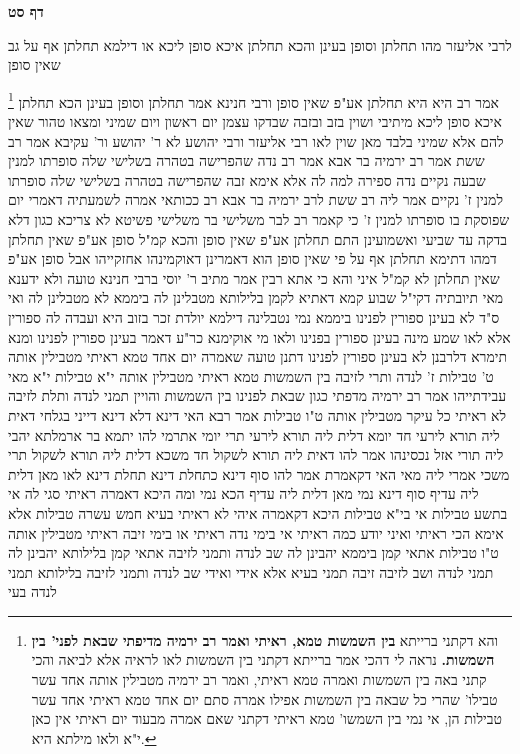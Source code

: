 \documentclass[12pt, openany]{book}
\newcommand{\sethebfont}{
\fontsize{10.5pt}{21.0pt} \selectfont
}
\newcommand{\twocol}[1]{
	{\sethebfont \begin{multicols}{2}
			#1
	\end{multicols}}	
}
\newcommand{\sectname}{}
\newcommand{\newsection}[1]{
	\addcontentsline{toc}{section}{#1}
	\renewcommand{\sectname}{#1}	
	\vspace{-\baselineskip}
	\begin{center}
		\textbf{%
\fontsize{16pt}{16pt}\selectfont
			#1}
	\end{center}
	\vspace{-\baselineskip}
	\nopagebreak
}
\newcommand{\footnotecomment}[1]{
	\renewcommand\thefootnote{}
	\footnote{#1}}
\newcommand{\commenta}[1]{\footnotecomment{#1}}
\begin{document}
\newsection{דף סט}
\twocol{לרבי אליעזר מהו תחלתן וסופן בעינן והכא תחלתן איכא סופן ליכא או דילמא תחלתן אף על גב שאין סופן 
\commenta{והא דקתני ברייתא \textbf{בין השמשות טמא, ראיתי ואמר רב ירמיה מדיפתי שבאת לפני' בין השמשות.} נראה לי דהכי אמר ברייתא דקתני בין השמשות לאו לראיה אלא לביאה והכי קתני באה בין השמשות ואמרה טמא ראיתי, ואמר רב ירמיה מטבילין אותה אחד עשר טבילו' שהרי כל שבאה בין השמשות אפילו אמרה סתם יום אחד טמא ראיתי אחד עשר טבילות הן, אי נמי בין השמשו' טמא ראיתי דקתני שאם אמרה מבעוד יום ראיתי אין כאן י"א ולאו מילתא היא. }
אמר רב היא היא תחלתן אע"פ שאין סופן ורבי חנינא אמר תחלתן וסופן בעינן הכא תחלתן איכא סופן ליכא 
מיתיבי ושוין בזב ובזבה שבדקו עצמן יום ראשון ויום שמיני ומצאו טהור שאין להם אלא שמיני בלבד מאן שוין לאו רבי אליעזר ורבי יהושע 
לא ר' יהושע ור' עקיבא 
אמר רב ששת אמר רב ירמיה בר אבא אמר רב נדה שהפרישה בטהרה בשלישי שלה סופרתו למנין שבעה נקיים 
נדה ספירה למה לה אלא אימא זבה שהפרישה בטהרה בשלישי שלה סופרתו למנין ז' נקיים 
אמר ליה רב ששת לרב ירמיה בר אבא רב ככותאי אמרה לשמעתיה דאמרי יום שפוסקת בו סופרתו למנין ז' 
כי קאמר רב לבר משלישי בר משלישי פשיטא לא צריכא כגון דלא בדקה עד שביעי
ואשמועינן התם תחלתן אע"פ שאין סופן והכא קמ"ל סופן אע"פ שאין תחלתן 
דמהו דתימא תחלתן אף על פי שאין סופן הוא דאמרינן דאוקמינהו אחזקייהו אבל סופן אע"פ שאין תחלתן לא קמ"ל 
איני והא כי אתא רבין אמר מתיב ר' יוסי ברבי חנינא טועה
ולא ידענא מאי תיובתיה דקי"ל שבוע קמא דאתיא לקמן בלילותא מטבלינן לה ביממא לא מטבלינן לה 
ואי ס"ד לא בעינן ספורין לפנינו ביממא נמי נטבלינה דילמא יולדת זכר בזוב היא ועבדה לה ספורין אלא לאו שמע מינה בעינן ספורין בפנינו 
ולאו מי אוקימנא כר"ע דאמר בעינן ספורין לפנינו 
ומנא תימרא דלרבנן לא בעינן ספורין לפנינו דתנן טועה שאמרה יום אחד טמא ראיתי מטבילין אותה ט' טבילות
ז' לנדה ותרי לזיבה בין השמשות טמא ראיתי מטבילין אותה י"א טבילות 
י"א מאי עבידתייהו אמר רב ירמיה מדפתי כגון שבאת לפנינו בין השמשות
והויין תמני לנדה ותלת לזיבה 
לא ראיתי כל עיקר מטבילין אותה ט"ו טבילות אמר רבא האי דינא דלא דינא דייני בגלחי דאית ליה תורא לירעי חד יומא דלית ליה תורא לירעי תרי יומי 
אתרמי להו יתמא בר ארמלתא יהבי ליה תורי אזל נכסינהו אמר להו דאית ליה תורא לשקול חד משכא דלית ליה תורא לשקול תרי משכי אמרי ליה מאי האי דקאמרת אמר להו סוף דינא כתחלת דינא תחלת דינא לאו מאן דלית ליה עדיף סוף דינא נמי מאן דלית ליה עדיף 
הכא נמי ומה היכא דאמרה ראיתי סגי לה אי בתשע טבילות אי בי"א טבילות היכא דקאמרה איהי לא ראיתי בעיא חמש עשרה טבילות 
אלא אימא הכי ראיתי ואיני יודע כמה ראיתי אי בימי נדה ראיתי או בימי זיבה ראיתי מטבילין אותה ט"ו טבילות אתאי קמן ביממא יהבינן לה שב לנדה
ותמני לזיבה אתאי קמן בלילותא יהבינן לה תמני לנדה ושב לזיבה
זיבה תמני בעיא אלא אידי ואידי שב לנדה ותמני לזיבה
בלילותא תמני לנדה בעי 
}
\end{document}
